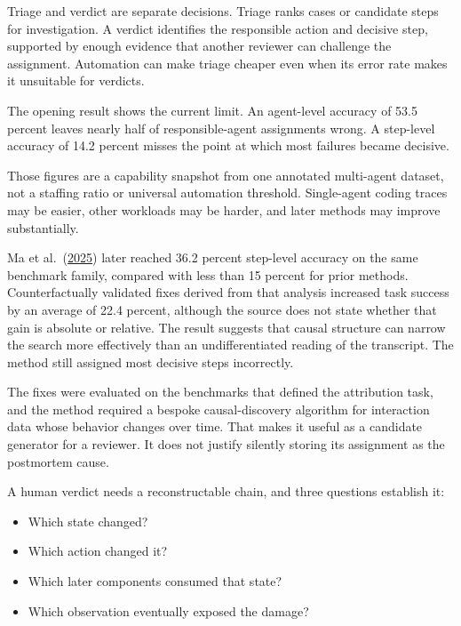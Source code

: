 Triage and verdict are separate decisions. Triage ranks cases or candidate steps for investigation. A verdict identifies the responsible action and decisive step, supported by enough evidence that another reviewer can challenge the assignment. Automation can make triage cheaper even when its error rate makes it unsuitable for verdicts.

The opening result shows the current limit. An agent-level accuracy of 53.5 percent leaves nearly half of responsible-agent assignments wrong. A step-level accuracy of 14.2 percent misses the point at which most failures became decisive.

Those figures are a capability snapshot from one annotated multi-agent dataset, not a staffing ratio or universal automation threshold. Single-agent coding traces may be easier, other workloads may be harder, and later methods may improve substantially.

Ma et al.~(\href{https://arxiv.org/abs/2509.08682}{2025}) later reached 36.2 percent step-level accuracy on the same benchmark family, compared with less than 15 percent for prior methods. Counterfactually validated fixes derived from that analysis increased task success by an average of 22.4 percent, although the source does not state whether that gain is absolute or relative. The result suggests that causal structure can narrow the search more effectively than an undifferentiated reading of the transcript. The method still assigned most decisive steps incorrectly.

The fixes were evaluated on the benchmarks that defined the attribution task, and the method required a bespoke causal-discovery algorithm for interaction data whose behavior changes over time. That makes it useful as a candidate generator for a reviewer. It does not justify silently storing its assignment as the postmortem cause.


A human verdict needs a reconstructable chain, and three questions establish it:

\begin{itemize}
\tightlist
\item
  Which state changed?
\item
  Which action changed it?
\item
  Which later components consumed that state?
\item
  Which observation eventually exposed the damage?
\end{itemize}


